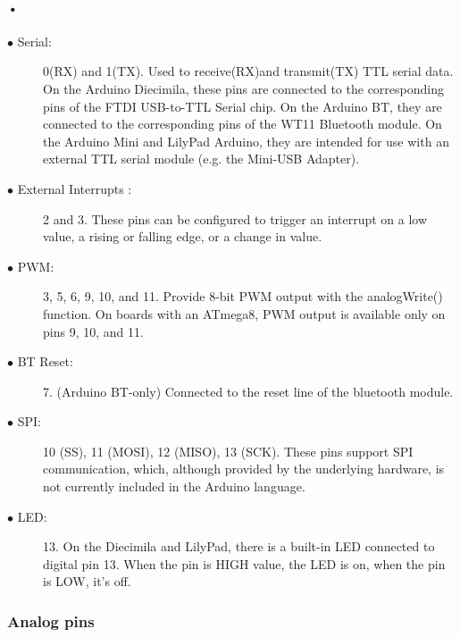 \documentclass[12pt]{extarticle}
\numberwithin{figure}{section}
\begin{document}
\paragraph{•}
\begin{description}
\item[$\bullet$ Serial: ] 0(RX) and 1(TX). Used to receive(RX)and transmit(TX) TTL serial data. On the Arduino Diecimila, these pins are connected to the corresponding pins of the FTDI USB-to-TTL Serial chip. On the Arduino BT, they are connected to the corresponding pins of the WT11 Bluetooth module. On the Arduino Mini and LilyPad Arduino, they are intended for use with an external TTL serial module (e.g. the Mini-USB Adapter). 
\end{description}

\begin{description}
\item[$\bullet$ External Interrupts :] 2 and 3. These pins can be configured to trigger an interrupt on a low value, a rising or falling edge, or a change in value.  
\end{description}
\begin{description}
\item[$\bullet$ PWM: ] 3, 5, 6, 9, 10, and 11. Provide 8-bit PWM output with the analogWrite() function. On boards with an ATmega8, PWM output is available only on pins 9, 10, and 11.  
\end{description}
\begin{description}
\item[$\bullet$ BT Reset: ] 7. (Arduino BT-only) Connected to the reset line of the bluetooth module.   
\end{description}
\begin{description}
\item[$\bullet$ SPI: ] 10 (SS), 11 (MOSI), 12 (MISO), 13 (SCK). These pins support SPI communication, which, although provided by the underlying hardware, is not currently included in the Arduino language. 
\end{description}

\begin{description}
\item[$\bullet$ LED:] 13. On the Diecimila and LilyPad, there is a built-in LED connected to digital pin 13. When the pin is HIGH value, the LED is on, when the pin is LOW, it's off. 
\end{description}

\subsubsection{Analog pins}
\end{document}
